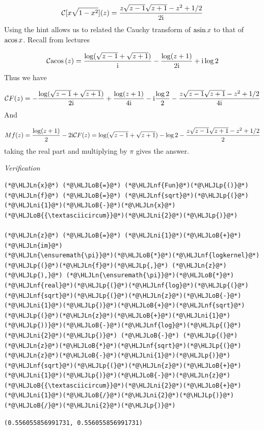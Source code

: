 \documentclass[12pt,a4paper]{article}
\newcommand{\HLJLn}[1]{#1}
\newcommand{\HLJLnf}[1]{\textcolor[RGB]{66,102,213}{#1}}
\newcommand{\HLJLni}[1]{\textcolor[RGB]{59,151,46}{#1}}
\newcommand{\HLJLoB}[1]{\textcolor[RGB]{102,102,102}{\textbf{#1}}}
\newcommand{\HLJLp}[1]{#1}
\def\I{ {\rm i} }
\def\CC{ {\cal C} }
\def\acos{ {\rm acos}\, }
\def\asin{ {\rm asin}\, }
\begin{document}
\[
\CC[x \sqrt{1-x^2}](z) = {z  \sqrt{z-1} \sqrt{z+1} - z^2 +1/2 \over 2 \I} 
\]
Using the hint allows us to related the Cauchy transform of $\asin x$ to that of $\acos x$. Recall from lectures

\[
\CC \acos(z) = {\log(\sqrt{z-1} + \sqrt{z+1}) \over \I} - {\log(z+1) \over 2 \I} + \I \log 2 
\]
Thus we have 

\[
\CC F(z) = -{\log(\sqrt{z-1} + \sqrt{z+1}) \over 2\I} + {\log(z+1) \over 4 \I} - \I {\log 2 \over 2} 
  - {z  \sqrt{z-1} \sqrt{z+1} - z^2 +1/2 \over 4 \I} 
\]
And

\[
M f(z) = {\log(z+1) \over 2} - 2 \I \CC F(z) = \log(\sqrt{z-1} + \sqrt{z+1})- \log 2 - {z  \sqrt{z-1} \sqrt{z+1} - z^2 +1/2 \over 2} 
\]
taking the real part and multiplying by \ensuremath{\pi} gives the answer.

\emph{Verification}


\begin{lstlisting}
(*@\HLJLn{x}@*) (*@\HLJLoB{=}@*) (*@\HLJLnf{Fun}@*)(*@\HLJLp{()}@*)
(*@\HLJLn{f}@*) (*@\HLJLoB{=}@*) (*@\HLJLnf{sqrt}@*)(*@\HLJLp{(}@*)(*@\HLJLni{1}@*)(*@\HLJLoB{-}@*)(*@\HLJLn{x}@*)(*@\HLJLoB{{\textasciicircum}}@*)(*@\HLJLni{2}@*)(*@\HLJLp{)}@*)

(*@\HLJLn{z}@*) (*@\HLJLoB{=}@*) (*@\HLJLni{1}@*)(*@\HLJLoB{+}@*)(*@\HLJLn{im}@*)
(*@\HLJLn{\ensuremath{\pi}}@*)(*@\HLJLoB{*}@*)(*@\HLJLnf{logkernel}@*)(*@\HLJLp{(}@*)(*@\HLJLn{f}@*)(*@\HLJLp{,}@*) (*@\HLJLn{z}@*)(*@\HLJLp{),}@*) (*@\HLJLn{\ensuremath{\pi}}@*)(*@\HLJLoB{*}@*)(*@\HLJLnf{real}@*)(*@\HLJLp{(}@*)(*@\HLJLnf{log}@*)(*@\HLJLp{(}@*)(*@\HLJLnf{sqrt}@*)(*@\HLJLp{(}@*)(*@\HLJLn{z}@*)(*@\HLJLoB{-}@*)(*@\HLJLni{1}@*)(*@\HLJLp{)}@*)(*@\HLJLoB{+}@*)(*@\HLJLnf{sqrt}@*)(*@\HLJLp{(}@*)(*@\HLJLn{z}@*)(*@\HLJLoB{+}@*)(*@\HLJLni{1}@*)(*@\HLJLp{))}@*)(*@\HLJLoB{-}@*)(*@\HLJLnf{log}@*)(*@\HLJLp{(}@*)(*@\HLJLni{2}@*)(*@\HLJLp{)}@*) (*@\HLJLoB{-}@*) (*@\HLJLp{(}@*)(*@\HLJLn{z}@*)(*@\HLJLoB{*}@*)(*@\HLJLnf{sqrt}@*)(*@\HLJLp{(}@*)(*@\HLJLn{z}@*)(*@\HLJLoB{-}@*)(*@\HLJLni{1}@*)(*@\HLJLp{)}@*)(*@\HLJLnf{sqrt}@*)(*@\HLJLp{(}@*)(*@\HLJLn{z}@*)(*@\HLJLoB{+}@*)(*@\HLJLni{1}@*)(*@\HLJLp{)}@*)(*@\HLJLoB{-}@*)(*@\HLJLn{z}@*)(*@\HLJLoB{{\textasciicircum}}@*)(*@\HLJLni{2}@*)(*@\HLJLoB{+}@*)(*@\HLJLni{1}@*)(*@\HLJLoB{/}@*)(*@\HLJLni{2}@*)(*@\HLJLp{)}@*)(*@\HLJLoB{/}@*)(*@\HLJLni{2}@*)(*@\HLJLp{)}@*)
\end{lstlisting}

\begin{lstlisting}
(0.556055856991731, 0.556055856991731)
\end{lstlisting}
\end{document}

